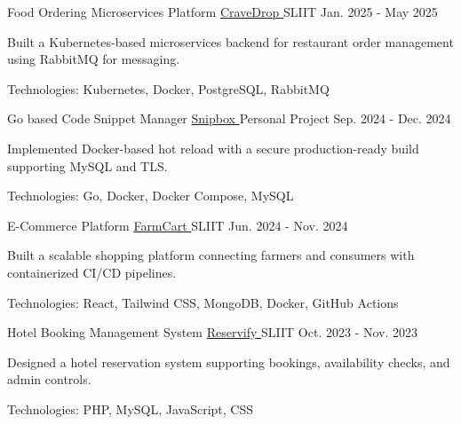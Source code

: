 
\begin{cventries}

  \cventry
    {Food Ordering Microservices Platform}
    {\href{https://github.com/nmdra/CraveDrop}{CraveDrop \faGithub}}
    {SLIIT}
    {Jan. 2025 - May 2025}
    {
      \begin{cvitems}
        \item {Built a Kubernetes-based microservices backend for restaurant order management using RabbitMQ for messaging.}
        \item {Technologies: Kubernetes, Docker, PostgreSQL, RabbitMQ}
      \end{cvitems}
    }

  \cventry
    {Go based Code Snippet Manager}
    {\href{https://github.com/nmdra/snipbox}{Snipbox \faGithub}}
    {Personal Project}
    {Sep. 2024 - Dec. 2024}
    {
      \begin{cvitems}
        \item {Implemented Docker-based hot reload with a secure production-ready build supporting MySQL and TLS.}
        \item {Technologies: Go, Docker, Docker Compose, MySQL}
      \end{cvitems}
    }

  \cventry
    {E-Commerce Platform}
    {\href{https://github.com/nmdra/FarmCart}{FarmCart \faGithub}}
    {SLIIT}
    {Jun. 2024 - Nov. 2024}
    {
      \begin{cvitems}
        \item {Built a scalable shopping platform connecting farmers and consumers with containerized CI/CD pipelines.}
        \item {Technologies: React, Tailwind CSS, MongoDB, Docker, GitHub Actions}
      \end{cvitems}
    }

  \cventry
    {Hotel Booking Management System}
    {\href{https://github.com/nmdra/Reservify}{Reservify \faGithub}}
    {SLIIT}
    {Oct. 2023 - Nov. 2023}
    {
      \begin{cvitems}
        \item {Designed a hotel reservation system supporting bookings, availability checks, and admin controls.}
        \item {Technologies: PHP, MySQL, JavaScript, CSS}
      \end{cvitems}
    }


\end{cventries}
